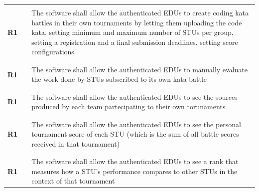 \begin{table}[H]
\begin{tabular}{l l p{12cm}}
                     &        &                                                                                                                                                                         \\\hline & & \\
        \textbf{R1} & \vline & The software shall allow the authenticated EDUs to create coding kata battles in their own tournaments by letting them uploading the code kata, setting minimum and maximum number of STUs per group, setting a registration and a final submission deadlines, setting score configurations                         \\
                     &        &                                                                                                                                                                         \\\hline & & \\
        \textbf{R1} & \vline & The software shall allow the authenticated EDUs to manually evaluate the work done by STUs subscribed to its own kata battle                                            \\
                     &        &                                                                                                                                                                         \\\hline & & \\
        \textbf{R1} & \vline & The software shall allow the authenticated EDUs to see the sources produced by each team partecipating to their own torunaments                                         \\
                    &        &                                                                                                                                                                         \\\hline & & \\
        \textbf{R1} & \vline & The software shall allow the authenticated EDUs to see the personal tournament score of each STU (which is the sum of all battle scores received in that tournament)    \\
                    &        &                                                                                                                                                                         \\\hline & & \\
        \textbf{R1} & \vline & The software shall allow the authenticated EDUs to see a rank that measures how a STU's performance compares to other STUs in the context of that tournament            \\

\end{tabular}
\end{table}
